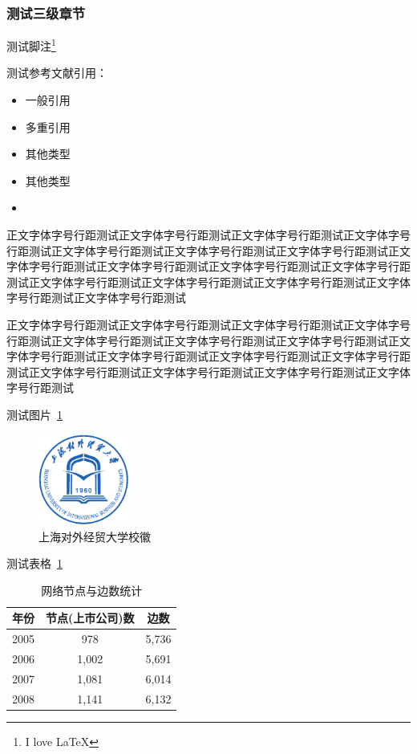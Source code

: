 \documentclass{SUIBEthesis}
\begin{document}
\subsubsection{测试三级章节}

测试脚注\footnote{I love \LaTeX}

测试参考文献引用：

\begin{itemize}
\item 一般引用\cite{lamport1994latex}
\item 多重引用\cite{lamport1994latex, knuth1984texbook}
\item 其他类型\cite[see][]{knuth1984texbook}
\item 其他类型\cite[section2]{knuth1984texbook}
  \item \cite[see][]{knuth1984texbook, lamport1994latex}
\end{itemize}


正文字体字号行距测试正文字体字号行距测试正文字体字号行距测试正文字体字号行距测试正文字体字号行距测试正文字体字号行距测试正文字体字号行距测试正文字体字号行距测试正文字体字号行距测试正文字体字号行距测试正文字体字号行距测试正文字体字号行距测试正文字体字号行距测试正文字体字号行距测试正文字体字号行距测试正文字体字号行距测试

正文字体字号行距测试正文字体字号行距测试正文字体字号行距测试正文字体字号行距测试正文字体字号行距测试正文字体字号行距测试正文字体字号行距测试正文字体字号行距测试正文字体字号行距测试正文字体字号行距测试正文字体字号行距测试正文字体字号行距测试正文字体字号行距测试正文字体字号行距测试正文字体字号行距测试


测试图片~\ref{fig:1} 

\begin{figure}[htbp!]
  \centering
  \includegraphics[height=3cm]{data/figure/logo.pdf}
  \caption{上海对外经贸大学校徽}
  \label{fig:1}
\end{figure}


测试表格~\ref{tab:1}

\begin{table}[htbp]
  \centering
  \caption{网络节点与边数统计}
  \begin{tabular}{ccc}
    \toprule
    \toprule
    年份    & 节点(上市公司)数   & 边数 \\
    \midrule
    2005  & 978   & 5,736 \\
    2006  & 1,002 & 5,691 \\
    2007  & 1,081 & 6,014 \\
    2008  & 1,141 & 6,132 \\
    \bottomrule
    \bottomrule
  \end{tabular}%
  \label{tab:1}%
\end{table}%
\end{document}
